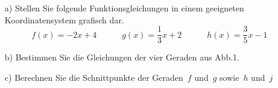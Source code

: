 



	\begin{itemize}
		\item[a)] Stellen Sie folgende Funktionsgleichungen in einem geeigneten Koordinatensystem grafisch dar.
		\begin{equation*}
			f(x) = -2x + 4 \qquad \quad g(x) = \frac{1}{3}x + 2 \quad \qquad h(x) = \frac{3}{5}x - 1
		\end{equation*}
		\item[b)] Bestimmen Sie die Gleichungen der vier Geraden aus Abb.1.
		\item[c)] Berechnen Sie die Schnittpunkte der Geraden~$f$ und~$g$ sowie~$h$ und~$j$
	\end{itemize}
